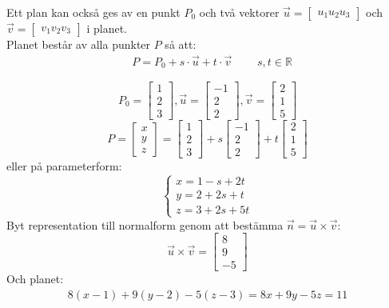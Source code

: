 \noindent
Ett plan kan också ges av en punkt $P_0$ och två vektorer $\vec{u} = \begin{bmatrix} u_1u_2u_3 \end{bmatrix}$ och $\vec{v} = \begin{bmatrix} v_1v_2v_3 \end{bmatrix}$ i planet.\\
Planet består av alla punkter $P$ så att:
\begin{align*}
&P = P_0 + s \cdot \vec{u} + t \cdot \vec{v}\mbox{  } &&s,t \in \mathbb{R}
\end{align*}
\begin{Ex}
    \[
        P_0 = \begin{bmatrix} 1\\2\\3 \end{bmatrix}, \vec{u} = \begin{bmatrix} -1\\2\\2 \end{bmatrix}, \vec{v} = \begin{bmatrix} 2\\1\\5 \end{bmatrix}
    \]
    \[
        P = \begin{bmatrix} x\\y\\z \end{bmatrix} = \begin{bmatrix} 1\\2\\3 \end{bmatrix} + s \begin{bmatrix} -1\\2\\2 \end{bmatrix} + t \begin{bmatrix} 2\\1\\5 \end{bmatrix}
    \]
    eller på parameterform:
    \[
        \begin{cases}
            x = 1-s + 2t \\
            y = 2+2s +t \\
            z = 3+2s +5t
        \end{cases}
    \]
    Byt representation till normalform genom att bestämma $\vec{n} = \vec{u} \times \vec{v}$:
    \[
        \vec{u} \times \vec{v} = \begin{bmatrix} 8\\9\\-5 \end{bmatrix} 
    \]
    Och planet:
    \begin{align*}
    8(x-1) + 9(y-2) - 5(z-3) = 8x + 9y - 5z = 11
    \end{align*}
\end{Ex}
